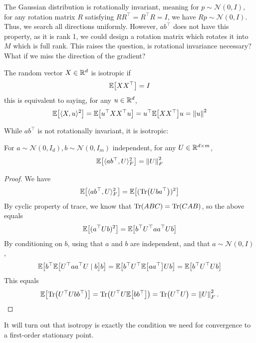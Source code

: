 The Gaussian distribution is rotationally invariant, meaning for $p \sim \mathcal N(0,I)$, for any rotation matrix $R$ satisfying $RR^\top = R^\top R = I$, we have $Rp \sim \mathcal N(0,I)$. Thus, we search all directions uniformly. However, $ab^\top$ does not have this property, as it is rank 1, we could design a rotation matrix which rotates it into $M$ which is full rank. This raises the question, is rotational invariance necessary? What if we miss the direction of the gradient?
\begin{definition}
    The random vector $X \in \mathbb{R}^d$ is isotropic if
    \begin{align*}
        \mathbb{E}\qty[XX^\top] = I
    \end{align*}
    this is equivalent to saying, for any $u \in \mathbb{R}^d$,
    \begin{align*}
        \mathbb{E}\qty[\langle X, u \rangle^2] = \mathbb{E}\qty[u^\top XX^\top u] = u^\top \mathbb{E}\qty[XX^\top]u = \left\lVert u \right\rVert^2
    \end{align*}
\end{definition}
While $ab^\top$ is not rotationally invariant, it is isotropic:
\begin{lemma}
    For $a \sim \mathcal N(0,I_d), b \sim \mathcal N(0, I_m)$ independent, for any $U \in \mathbb{R}^{d \times m}$,
    \begin{align*}
        \mathbb{E}\qty[\langle ab^\top, U \rangle_F^2] = \left\lVert U \right\rVert_F^2
    \end{align*}
\end{lemma}
\begin{proof}
    We have
    \begin{align*}
        \mathbb{E}\qty[\langle ab^\top, U \rangle_F^2] = \mathbb{E}\qty[(\Tr(U b a^\top))^2]
    \end{align*}
    By cyclic property of trace, we know that $\Tr(ABC)=\Tr(CAB)$, so the above equals
    \begin{align*}
        \mathbb{E}\qty[(a^\top U b)^2] = \mathbb{E}\qty[b^\top U^\top a a^\top U b]
    \end{align*}
    By conditioning on $b$, using that $a$ and $b$ are independent, and that $a \sim \mathcal N(0,I)$,
    \begin{align*}
        \mathbb{E}\qty[b^\top \mathbb{E}\qty[U^\top a a^\top U \mid b] b] = \mathbb{E}\qty[b^\top U^\top \mathbb{E}\qty[aa^\top] U b] = \mathbb{E}\qty[b^\top U^\top U b]
    \end{align*}
    This equals
    \begin{align*}
        \mathbb{E}\qty[\Tr(U^\top U bb^\top)] = \Tr(U^\top U \mathbb{E}\qty[bb^\top]) = \Tr(U^\top U) = \left\lVert U \right\rVert_F^2.
    \end{align*}
\end{proof}
It will turn out that isotropy is exactly the condition we need for convergence to a first-order stationary point. 

